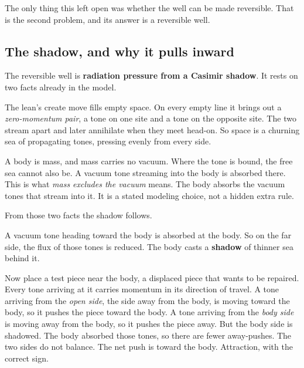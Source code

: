 The only thing this left open was whether the well can be made reversible. That is the second problem, and its answer is a reversible well.

\subsection{The shadow, and why it pulls inward}

The reversible well is \textbf{radiation pressure from a Casimir shadow}. It rests on two facts already in the model.

\begin{definition}
The lean's create move fills empty space. On every empty line it brings out a \emph{zero-momentum pair}, a tone on one site and a tone on the opposite site. The two stream apart and later annihilate when they meet head-on. So space is a churning sea of propagating tones, pressing evenly from every side.
\end{definition}

\begin{definition}
A body is mass, and mass carries no vacuum. Where the tone is bound, the free sea cannot also be. A vacuum tone streaming into the body is absorbed there. This is what \emph{mass excludes the vacuum} means. The body absorbs the vacuum tones that stream into it. It is a stated modeling choice, not a hidden extra rule.
\end{definition}

From those two facts the shadow follows.

\begin{result}
A vacuum tone heading toward the body is absorbed at the body. So on the far side, the flux of those tones is reduced. The body casts a \textbf{shadow} of thinner sea behind it.
\end{result}

Now place a test piece near the body, a displaced piece that wants to be repaired. Every tone arriving at it carries momentum in its direction of travel. A tone arriving from the \emph{open side}, the side away from the body, is moving toward the body, so it pushes the piece toward the body. A tone arriving from the \emph{body side} is moving away from the body, so it pushes the piece away. But the body side is shadowed. The body absorbed those tones, so there are fewer away-pushes. The two sides do not balance. The net push is toward the body. Attraction, with the correct sign.

